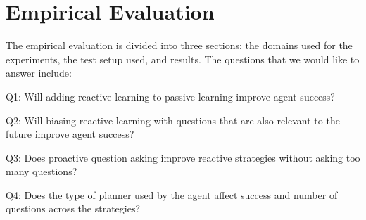 \documentclass[letterpaper]{article}
\newenvironment{packed_itemize}{
\begin{itemize}
  \setlength{\itemsep}{1pt}
  \setlength{\parskip}{0pt}
  \setlength{\parsep}{0pt}
}{\end{itemize}}
\begin{document}
 



\section{Empirical Evaluation}
The empirical evaluation is divided into three sections:  the domains used for
the experiments, the test setup used, and results.  The questions that we would like to answer
include:



\begin{packed_itemize}
  \item Q1: Will adding reactive learning to passive
  learning improve agent success?
  \item Q2: Will  biasing reactive learning with questions that are also
  relevant to the future improve agent success?
  \item Q3: Does proactive question asking improve reactive strategies without
  asking too many questions?
  \item Q4: Does the type of planner used by the agent affect success and number
  of questions across the strategies?
\end{packed_itemize}
\end{document}
